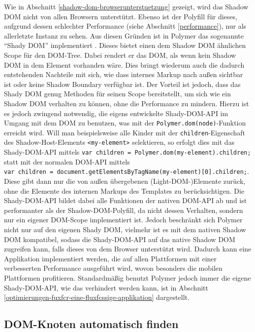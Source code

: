 Wie in Abschnitt \ref{shadow-dom-browserunterstuetzung} gezeigt, wird das Shadow \ac{DOM} nicht von allen Browsern unterstützt. Ebenso ist der Polyfill für dieses, aufgrund dessen schlechter Performance (siehe Abschnitt \ref{performance}), nur als allerletzte Instanz zu sehen. Aus diesen Gründen ist in Polymer das sogenannte ``Shady \ac{DOM}'' implementiert \cite{citeulike:13886251}. Dieses bietet einen dem Shadow \ac{DOM} ähnlichen Scope für den \ac{DOM}-Tree. Dabei rendert er das \ac{DOM}, als wenn kein Shadow \ac{DOM} in dem Element vorhanden wäre. Dies bringt wiederum auch die dadurch entstehenden Nachteile mit sich, wie dass internes Markup nach außen sichtbar ist oder keine Shadow Boundary verfügbar ist. Der Vorteil ist jedoch, dass das Shady \ac{DOM} genug Methoden für seinen Scope bereitstellt, um sich wie ein Shadow \ac{DOM} verhalten zu können, ohne die Performance zu mindern. Hierzu ist es jedoch zwingend notwendig, die eigens entwickelte Shady-\ac{DOM}-\ac{API} im Umgang mit dem \ac{DOM} zu benutzen, was mit der \texttt{Polymer.dom(node)}-Funktion erreicht wird. Will man beispielsweise alle Kinder mit der \texttt{children}-Eigenschaft des Shadow-Host-Elements \texttt{\textless{}my-element\textgreater{}} selektieren, so erfolgt dies mit das Shady-\ac{DOM}-\ac{API} mittels \texttt{var\ children\ =\ Polymer.dom(my-element).children;} statt mit der normalen \ac{DOM}-\ac{API} mittels \texttt{var\ children\ =\ document.getElementsByTagName(\dq my-element\dq){[}0{]}.children;}. Diese gibt dann nur die von außen übergebenen (Light-\ac{DOM}-)Elemente zurück, ohne die Elemente des internen Markups des Templates zu berücksichtigen. Die Shady-\ac{DOM}-\ac{API} bildet dabei alle Funktionen der nativen \ac{DOM}-\ac{API} ab und ist performanter als der Shadow-\ac{DOM}-Polyfill, da nicht dessen Verhalten, sondern nur ein eigener \ac{DOM}-Scope implementiert ist. Jedoch beschränkt sich Polymer nicht nur auf den eigenen Shady \ac{DOM}, vielmehr ist es mit dem nativen Shadow \ac{DOM} kompatibel, sodass die Shady-\ac{DOM}-\ac{API} auf das native Shadow \ac{DOM} zugreifen kann, falls dieses von dem Browser unterstützt wird. Dadurch kann eine Applikation implementiert werden, die auf allen Plattformen mit einer verbesserten Performance ausgeführt wird, wovon besonders die mobilen Plattformen profitieren. Standardmäßig benutzt Polymer jedoch immer die eigene Shady-\ac{DOM}-\ac{API}, wie das verhindert werden kann, ist in Abschnitt \ref{optimierungen-fuxfcr-eine-fluxfcssige-applikation} dargestellt.


\subsection{DOM-Knoten automatisch finden}\label{dom-knoten-automatisch-finden}

